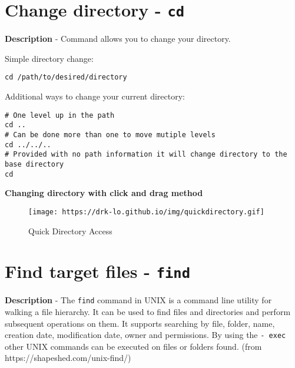 \documentclass[
  letterpaper,
  DIV=11,
  numbers=noendperiod]{scrreprt}
\begin{document}
\hypertarget{change-directory---cd}{%
\section*{\texorpdfstring{\textbf{Change directory -
\texttt{cd}}}{Change directory - cd}}\label{change-directory---cd}}


\textbf{Description} - Command allows you to change your directory.

Simple directory change:

\begin{verbatim}
cd /path/to/desired/directory
\end{verbatim}

Additional ways to change your current directory:

\begin{verbatim}
# One level up in the path
cd ..
# Can be done more than one to move mutiple levels
cd ../../..
# Provided with no path information it will change directory to the base directory
cd
\end{verbatim}

\textbf{Changing directory with click and drag method}

\begin{figure}

{\centering \texttt{[image: https://drk-lo.github.io/img/quickdirectory.gif]}

}

\caption{Quick Directory Access}

\end{figure}

\hypertarget{find-target-files---find}{%
\section*{\texorpdfstring{\textbf{Find target files -
\texttt{find}}}{Find target files - find}}\label{find-target-files---find}}


\textbf{Description} - The \texttt{find} command in UNIX is a command
line utility for walking a file hierarchy. It can be used to find files
and directories and perform subsequent operations on them. It supports
searching by file, folder, name, creation date, modification date, owner
and permissions. By using the \texttt{-\ exec} other UNIX commands can
be executed on files or folders found. (from
https://shapeshed.com/unix-find/)
\end{document}
